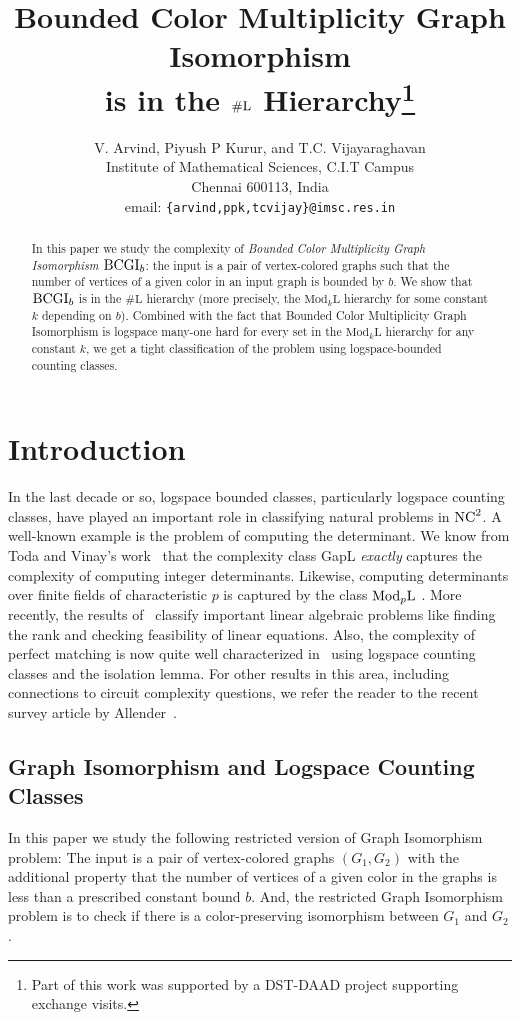 \documentclass[11pt]{article}
\title{Bounded Color Multiplicity Graph Isomorphism\\ is in 
the $\#\Lo$ Hierarchy\thanks{Part of this work was supported 
by a DST-DAAD project supporting exchange visits.}}
\author{
  V. Arvind, Piyush P Kurur, and T.C. Vijayaraghavan \\
  Institute of Mathematical Sciences, C.I.T Campus\\ 
  Chennai 600113, India\\
  email: {\tt\{arvind,ppk,tcvijay\}@imsc.res.in}\\
}
\date{}
\newcommand{\Mod}[1]{\ensuremath{\mathrm{Mod}_{#1}\mathrm{L}}}
\newcommand{\Lo}{\ensuremath{\mathrm{L}}}
\newcommand{\ModpL}{\mbox{\rm Mod$_p$L}}
\newcommand{\NC}{\mbox{\rm NC}}
\newcommand{\NCtwo}{\ensuremath{\NC^2}}
\newcommand{\BCGI}{\mbox{\rm BCGI}}
\begin{document}
\maketitle

\begin{abstract}
In this paper we study the complexity of \emph{Bounded Color
Multiplicity Graph Isomorphism} $\BCGI_b$: the input is a pair of
vertex-colored graphs such that the number of vertices of a given
color in an input graph is bounded by $b$. We show that $\BCGI_b$ is
in the $\#\Lo$ hierarchy (more precisely, the $\Mod{k}$ hierarchy for
some constant $k$ depending on $b$). Combined with the fact that
Bounded Color Multiplicity Graph Isomorphism is logspace many-one hard
for every set in the $\Mod{k}$ hierarchy for any constant $k$, we get
a tight classification of the problem using logspace-bounded counting
classes.
\end{abstract}

\section{Introduction}

In the last decade or so, logspace bounded classes, particularly
logspace counting classes, have played an important role in
classifying natural problems in $\NCtwo$. A well-known example is the
problem of computing the determinant. We know from Toda and Vinay's
work~\cite{toda91counting,vinay91counting} that the complexity class
GapL \emph{exactly} captures the complexity of computing integer
determinants. Likewise, computing determinants over finite fields of
characteristic $p$ is captured by the class $\ModpL$ \cite{DH}. More
recently, the results of~\cite{allender99complexity} classify
important linear algebraic problems like finding the rank and checking
feasibility of linear equations. Also, the complexity of perfect
matching is now quite well characterized in~\cite{allender99isolation}
using logspace counting classes and the isolation lemma. For other
results in this area, including connections to circuit complexity
questions, we refer the reader to the recent survey article by
Allender~\cite{quaderni}.

\subsection{Graph Isomorphism and Logspace Counting Classes}

In this paper we study the following restricted version of Graph
Isomorphism problem: The input is a pair of vertex-colored graphs
$(G_1,G_2)$ with the additional property that the number of vertices
of a given color in the graphs is less than a prescribed constant
bound $b$. And, the restricted Graph Isomorphism problem is to check
if there is a color-preserving isomorphism between $G_1$ and $G_2$.
\end{document}
